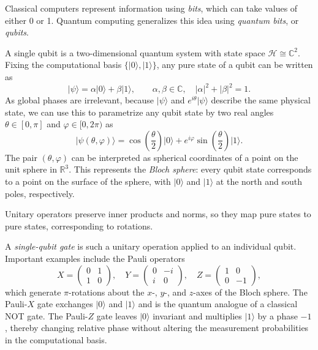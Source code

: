 \documentclass[12pt,a4paper,openany]{report}
\newcommand{\ket}[1]{\lvert #1 \rangle}
\begin{document}
Classical computers represent information using \textit{bits}, which can take values of either 0 or 1. Quantum computing generalizes this idea using \textit{quantum bits}, or \textit{qubits}.

A single qubit is a two-dimensional quantum system with state space $\mathcal{H} \cong \mathbb{C}^2$. Fixing the computational basis $\{\ket{0},\ket{1}\}$, any pure state of a qubit can be written as
\begin{equation}
  \ket{\psi} = \alpha \ket{0} + \beta \ket{1}, \qquad \alpha,\beta \in \mathbb{C}, \quad \lvert \alpha \rvert^2 + \lvert \beta \rvert^2 = 1.
\end{equation}
As global phases are irrelevant, because $\ket{\psi}$ and $e^{i\theta}\ket{\psi}$ describe the same physical state, we can use this to parametrize any qubit state by two real angles $\theta \in [0,\pi]$ and $\varphi \in [0,2\pi)$ as
\begin{equation}
  \ket{\psi(\theta,\varphi)} = \cos\!\left(\frac{\theta}{2}\right)\ket{0}
  + e^{i\varphi} \sin\!\left(\frac{\theta}{2}\right)\ket{1}.
\end{equation}
The pair $(\theta,\varphi)$ can be interpreted as spherical coordinates of a point on the unit sphere in $\mathbb{R}^3$. This represents the \emph{Bloch sphere}: every qubit state corresponds to a point on the surface of the sphere, with $\ket{0}$ and $\ket{1}$ at the north and south poles, respectively.


Unitary operators preserve inner products and norms, so they map pure states to pure states, corresponding to rotations. 

A \emph{single-qubit gate} is such a unitary operation applied to an individual qubit. Important examples include the Pauli operators
\begin{equation}
  X = \begin{pmatrix} 0 & 1 \\ 1 & 0 \end{pmatrix}, \quad
  Y = \begin{pmatrix} 0 & -i \\ i & 0 \end{pmatrix}, \quad
  Z = \begin{pmatrix} 1 & 0 \\ 0 & -1 \end{pmatrix},
\end{equation}
which generate $\pi$-rotations about the $x$-, $y$-, and $z$-axes of the Bloch sphere. The Pauli-$X$ gate exchanges $\ket{0}$ and $\ket{1}$ and is the quantum analogue of a classical NOT gate. The Pauli-$Z$ gate leaves $\ket{0}$ invariant and multiplies $\ket{1}$ by a phase $-1$, thereby changing relative phase without altering the measurement probabilities in the computational basis.
\end{document}
